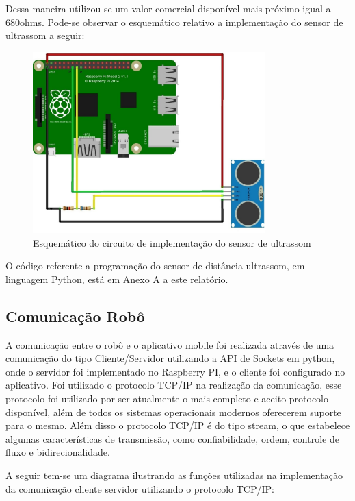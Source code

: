Dessa maneira utilizou-se um valor comercial disponível mais próximo igual a 680ohms. Pode-se observar o esquemático relativo a implementação do sensor de ultrassom a seguir:

\begin{figure}[H]
    \centering
    \includegraphics[width=0.8\textwidth]{figuras/esquematico_ultrassom.eps}
    \caption{Esquemático do circuito de implementação do sensor de ultrassom}
    \label{fig:catia01}
\end{figure}

O código referente a programação do sensor de distância ultrassom, em linguagem Python, está em Anexo A a este relatório.

\subsection{Comunicação Robô}

A comunicação entre o robô e o aplicativo mobile foi realizada através de uma comunicação do tipo Cliente/Servidor utilizando a API de Sockets em python, onde o servidor foi implementado no Raspberry PI, e o cliente foi configurado no aplicativo. Foi utilizado o protocolo TCP/IP na realização da comunicação, esse protocolo foi utilizado por ser atualmente o mais completo e aceito protocolo disponível, além de todos os sistemas operacionais modernos oferecerem suporte para o mesmo. Além disso o protocolo TCP/IP é do tipo stream, o que estabelece algumas características de transmissão, como confiabilidade, ordem, controle de fluxo e bidirecionalidade.

A seguir tem-se um diagrama ilustrando as funções utilizadas na implementação da comunicação cliente servidor utilizando o protocolo TCP/IP:

